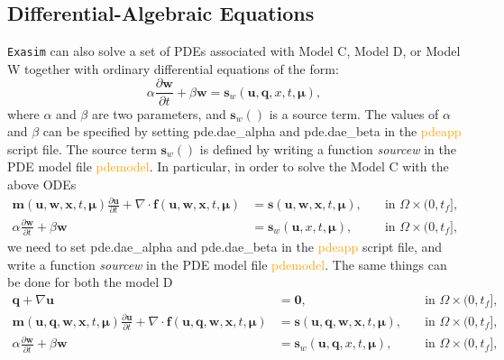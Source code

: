 \documentclass[11pt]{article}
\begin{document}
\subsection{Differential-Algebraic Equations}


\texttt{Exasim}  can also solve a set of PDEs associated with Model C, Model D, or Model W together with ordinary differential equations of the form:
\begin{equation}
\label{modela0}
\alpha \frac{\partial \bm w}{\partial t}   +  \beta \bm w  =  \bm s_w(\bm u, \bm q, x, t, \bm \mu) ,
\end{equation}
where $\alpha$ and $\beta$ are two parameters, and $\bm s_w()$ is a source term. The values of $\alpha$ and $\beta$ can be specified by setting pde.dae\_alpha and pde.dae\_beta in the \textcolor{orange}{pdeapp}  script file. The source term $\bm s_w()$ is defined by writing a function {\em sourcew} in the PDE model file \textcolor{orange}{pdemodel}. In particular, in order to solve the Model C with the above ODEs 
\begin{subequations}
\label{modela1}
\begin{alignat}{2}
\bm m(\bm{u},   \bm w, \bm x,t, \bm \mu) \frac{\partial \bm{u}}{\partial t} + \nabla \cdot \bm{f}(\bm{u}, \bm w, \bm x,t, \bm \mu) &=  \bm s(\bm{u},  \bm w,  \bm x,t, \bm \mu), & \quad \mbox{in } \Omega \times (0, t_f], \\
\alpha \frac{\partial \bm w}{\partial t}   +  \beta \bm w & =  \bm s_w(\bm u, x, t, \bm \mu),  & \quad \mbox{in } \Omega \times (0, t_f] ,
\end{alignat}
\end{subequations}
we need to set pde.dae\_alpha and pde.dae\_beta in the \textcolor{orange}{pdeapp}  script file, and write a function {\em sourcew} in the PDE model file \textcolor{orange}{pdemodel}. The same things can be done for both the model D  
\begin{subequations}
\label{modela2}
\begin{alignat}{2}
\bm q + \nabla \bm u & =  \bm 0,  & \quad \mbox{in } \Omega \times (0, t_f], \\
\bm m(\bm{u}, \bm q,  \bm w, \bm x,t, \bm \mu) \frac{\partial \bm{u}}{\partial t} + \nabla \cdot \bm{f}(\bm{u}, \bm q, \bm w, \bm x,t, \bm \mu) &=  \bm s(\bm{u}, \bm q, \bm w,  \bm x,t, \bm \mu), & \quad \mbox{in } \Omega \times (0, t_f], \\
\alpha \frac{\partial \bm w}{\partial t}   +  \beta \bm w & =  \bm s_w(\bm u, \bm q, x, t, \bm \mu),  & \quad \mbox{in } \Omega \times (0, t_f] ,
\end{alignat}
\end{subequations}
\end{document}
